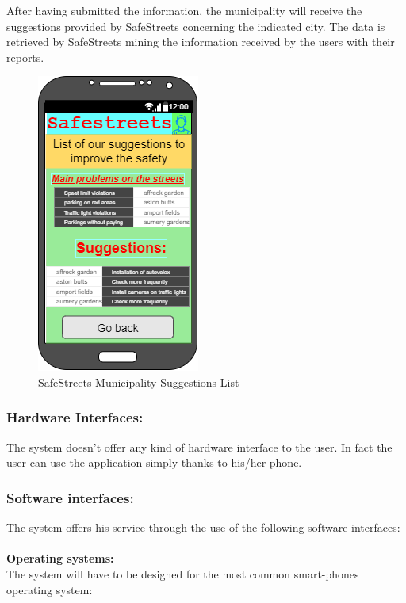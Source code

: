 \documentclass[titlepage]{article}
\begin{document}
\begin{itemize}
\begin{itemize}
	\newpage
	
	
	
	After having submitted the information, the municipality will receive the suggestions provided by SafeStreets concerning the indicated city. The data is retrieved by SafeStreets mining the information received by the users with their reports.
	
	
	\begin{figure}[h]
	\includegraphics[scale=0.95]{Mockups/List of suggestions.png}
	\centering
	\caption{SafeStreets Municipality Suggestions List}
	\end{figure}
	\FloatBarrier
	
	\newpage
	
		
		
	\end{itemize}

		
		
	\end{itemize}
	
\subsubsection{Hardware Interfaces: }
The system doesn't offer any kind of hardware interface to the user. In fact the user can use the application simply thanks to his/her phone.
\subsubsection{Software interfaces: }
The system offers his service through the use of the following software interfaces:\\ \\
\textbf{Operating systems:\\ }
The system will have to be designed for the most common smart-phones operating system: 
	
\end{document}
